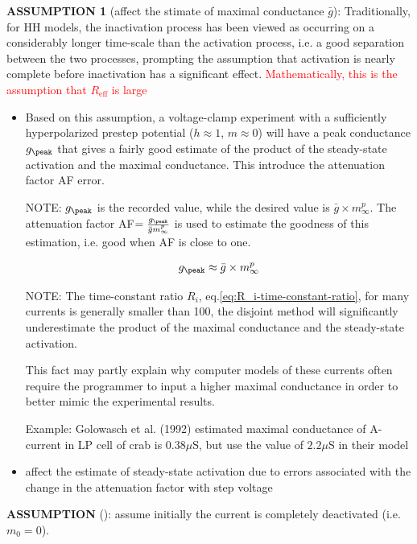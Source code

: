 {\bf ASSUMPTION 1} (affect the stimate of maximal conductance $\bar{g}$):
Traditionally, for HH models, the inactivation process has been viewed as
occurring on a considerably longer time-scale than the activation process, i.e.
a good separation between the two processes, prompting the assumption that
activation is nearly complete before inactivation has a significant effect.
\textcolor{red}{Mathematically, this is the assumption that $R_\text{eff}$ is large}
\begin{itemize}
  \item   Based on this assumption, a voltage-clamp experiment with
a sufficiently hyperpolarized prestep potential ($h\approx 1$, $m\approx 0$)
will have a peak conductance $g_\peak$ that gives a fairly good estimate of the
product of the steady-state activation and the maximal conductance. This
introduce the attenuation factor AF error.

NOTE: $g_\peak$ is the recorded value, while the desired value is $\bar{g}
\times m_\infty^p$. The attenuation factor
AF$=\frac{g_\peak}{\bar{g}m_\infty^p}$ is used to estimate the goodness of this
estimation, i.e. good when AF is close to one.

\begin{equation}
g_\peak \approx \bar{g} \times m_\infty^p
\end{equation}

NOTE: The time-constant ratio $R_i$, eq.\ref{eq:R_i-time-constant-ratio}, for
many currents is generally smaller than 100, the disjoint method will
significantly underestimate the product of the maximal conductance and the
steady-state activation.

This fact may partly explain why computer models of these currents often require
the programmer to input a higher maximal conductance in order to better mimic
the experimental results.

Example: Golowasch et al. (1992) estimated maximal conductance of A-current in
LP cell of crab is $0.38 \mu$S, but use the value of $2.2\mu$S in their model

  \item affect the estimate of steady-state activation due to errors
  associated with the change in the attenuation factor with step voltage
\end{itemize}

{\bf ASSUMPTION } (): assume initially the current is completely deactivated
(i.e. $m_0 = 0$).


